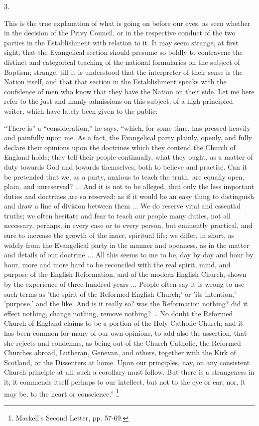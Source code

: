 3.

This is the true explanation of what is going on before our eyes,
as seen whether in the decision of the Privy Council, or in the
respective conduct of the two parties in the Establishment with
relation to it. It may seem strange, at first sight, that the
Evangelical section should presume so boldly to contravene the distinct and categorical teaching of the national formularies on the
subject of Baptism; strange, till it is understood that the
interpreter of their sense is the Nation itself, and that that section
in the Establishment speaks with the confidence of men who know that
they have the Nation on their side. Let me here refer to the just and
manly admissions on this subject, of a high-principled writer, which
have lately been given to the public:—

``There is'' a ``consideration,'' he says,
``which, for some time, has pressed heavily and painfully upon me.
As a fact, the Evangelical party plainly, openly, and fully declare
their opinions upon the doctrines which they contend the Church of
England holds; they tell their people continually, what they ought, as
a matter of duty towards God and towards themselves, both to believe
and practise. Can it be pretended that we, as a party, anxious to
teach the truth, are equally open, plain, and unreserved? ... And it
is not to be alleged, that only the less important duties and
doctrines are so reserved: as if it would be an easy thing to
distinguish and draw a line of division between them ... We do reserve
vital and essential truths; we often hesitate and fear to teach our
people many duties, not all necessary, perhaps, in every case or to
every person, but eminently practical, and sure to increase the growth
of the inner, spiritual life; we differ, in short, as widely from the
Evangelical party in the manner and openness, as in the matter and
details of our doctrine ... All this seems to me to be, day by day and
hour by hour, more and more hard to be reconciled with the real
spirit, mind, and purpose of the English Reformation, and of the
modern English Church, shown by the experience of three hundred years
... People often say it is wrong to use such terms as 'the spirit of
the Reformed English Church;' or 'its intention,' 'purpose,' and the
like. And is it really so? was the Reformation nothing? did it effect
nothing, change nothing, remove nothing? … No doubt the Reformed
Church of England claims to be a portion of the Holy Catholic Church;
and it has been common for many of our own opinions, to add also the
assertion, that she rejects and condemns, as being out of the Church
Catholic, the Reformed Churches abroad, Lutheran, Genevan, and others,
together with the Kirk of Scotland, or the Dissenters at home. Upon
our principles, nay, on any consistent Church principle at all, such a
corollary must follow. But there is a strangeness in it; it commends
itself perhaps to our intellect, but not to the eye or ear; nor, it
may be, to the heart or conscience.'' \footnote{Maskell's Second Letter, pp. 57-69.}

